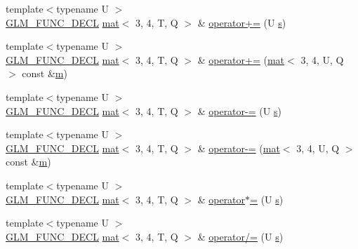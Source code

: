 \begin{DoxyCompactItemize}
\item 
{\footnotesize template$<$typename U $>$ }\\\hyperlink{setup_8hpp_ab2d052de21a70539923e9bcbf6e83a51}{G\+L\+M\+\_\+\+F\+U\+N\+C\+\_\+\+D\+E\+CL} \hyperlink{structglm_1_1mat}{mat}$<$ 3, 4, T, Q $>$ \& \hyperlink{structglm_1_1mat_3_013_00_014_00_01_t_00_01_q_01_4_a9163c941f48d04e8f91190449d98de9c}{operator+=} (U \hyperlink{_s_d_l__opengl_8h_a4af680a6c683f88ed67b76f207f2e6e4}{s})
\item 
{\footnotesize template$<$typename U $>$ }\\\hyperlink{setup_8hpp_ab2d052de21a70539923e9bcbf6e83a51}{G\+L\+M\+\_\+\+F\+U\+N\+C\+\_\+\+D\+E\+CL} \hyperlink{structglm_1_1mat}{mat}$<$ 3, 4, T, Q $>$ \& \hyperlink{structglm_1_1mat_3_013_00_014_00_01_t_00_01_q_01_4_a73961279838cd60b4889d54bf955a3b1}{operator+=} (\hyperlink{structglm_1_1mat}{mat}$<$ 3, 4, U, Q $>$ const \&\hyperlink{_s_d_l__opengl__glext_8h_af593500c283bf1a787a6f947f503a5c2}{m})
\item 
{\footnotesize template$<$typename U $>$ }\\\hyperlink{setup_8hpp_ab2d052de21a70539923e9bcbf6e83a51}{G\+L\+M\+\_\+\+F\+U\+N\+C\+\_\+\+D\+E\+CL} \hyperlink{structglm_1_1mat}{mat}$<$ 3, 4, T, Q $>$ \& \hyperlink{structglm_1_1mat_3_013_00_014_00_01_t_00_01_q_01_4_adfa9d48451ea4991d39f4ed1649f8afd}{operator-\/=} (U \hyperlink{_s_d_l__opengl_8h_a4af680a6c683f88ed67b76f207f2e6e4}{s})
\item 
{\footnotesize template$<$typename U $>$ }\\\hyperlink{setup_8hpp_ab2d052de21a70539923e9bcbf6e83a51}{G\+L\+M\+\_\+\+F\+U\+N\+C\+\_\+\+D\+E\+CL} \hyperlink{structglm_1_1mat}{mat}$<$ 3, 4, T, Q $>$ \& \hyperlink{structglm_1_1mat_3_013_00_014_00_01_t_00_01_q_01_4_a0e378e1f0547facbe5707f64358a0eee}{operator-\/=} (\hyperlink{structglm_1_1mat}{mat}$<$ 3, 4, U, Q $>$ const \&\hyperlink{_s_d_l__opengl__glext_8h_af593500c283bf1a787a6f947f503a5c2}{m})
\item 
{\footnotesize template$<$typename U $>$ }\\\hyperlink{setup_8hpp_ab2d052de21a70539923e9bcbf6e83a51}{G\+L\+M\+\_\+\+F\+U\+N\+C\+\_\+\+D\+E\+CL} \hyperlink{structglm_1_1mat}{mat}$<$ 3, 4, T, Q $>$ \& \hyperlink{structglm_1_1mat_3_013_00_014_00_01_t_00_01_q_01_4_a7e71aded236353963c211f3c5401201f}{operator$\ast$=} (U \hyperlink{_s_d_l__opengl_8h_a4af680a6c683f88ed67b76f207f2e6e4}{s})
\item 
{\footnotesize template$<$typename U $>$ }\\\hyperlink{setup_8hpp_ab2d052de21a70539923e9bcbf6e83a51}{G\+L\+M\+\_\+\+F\+U\+N\+C\+\_\+\+D\+E\+CL} \hyperlink{structglm_1_1mat}{mat}$<$ 3, 4, T, Q $>$ \& \hyperlink{structglm_1_1mat_3_013_00_014_00_01_t_00_01_q_01_4_ad030328f7205db4ada21b930d484bdea}{operator/=} (U \hyperlink{_s_d_l__opengl_8h_a4af680a6c683f88ed67b76f207f2e6e4}{s})

\end{DoxyCompactItemize}
